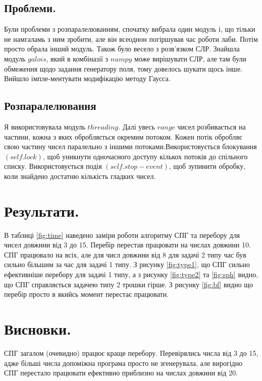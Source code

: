 \documentclass[a4paper,12pt]{article}
\begin{document}
\subsection{Проблеми.}
Були проблеми з розпаралелюванням, спочатку вибрала один модуль і, що тільки не намгаламь з ним зробити, але він всеоднон погіршував час роботи лаби. Потім просто обрала інший модуль. Також було весело з розв'язком СЛР. Знайшла модуль $galois$, який в комбіназії з $numpy$ може вирішувати СЛР, але там були обмеження щодо задання генератору поля, тому довелось шукати щось інше. Вийшло імпле-ментувати модифікацію методу Гаусса.
\subsection{Розпаралелювання}
Я використовувала модуль $threading$. Далі увесь $range$ чисел розбивається на частини, кожна з яких обробляється окремим потоком.  Кожен потік обробляє свою частину чисел паралельно з іншими потоками.Використовується блокування $(self.lock)$, щоб уникнути одночасного доступу кількох потоків до спільного списку. Використовується подія $(self.stop-event)$, щоб зупинити обробку, коли знайдено достатню кількість гладких чисел.
\section{Результати.}
В таблиці \ref{fig:time} наведено заміри роботи алгоритму СПГ та перебору для чисел довжини від 3 до 15. Перебір перестав працювати на числах довжини 10. СПГ працювало на всіх, але для числ довжини від 8 для задачі 2 типу час був сильно більшим за час для задачі 1 типу. З рисунку \ref{fig:type1}, що СПГ сильно ефективніше перебору для задачі 1 типу, а з рисунку \ref{fig:type2} та \ref{fig:sph} видно, що СПГ справляється задачею типу 2 трошки гірше. З рисунку \ref{fig:bf} видно що перебір просто в якийсь момент  перестає працювати. 
\section{Висновки.}
СПГ загалом (очевидно) працює краще перебору. Перевірялись числа від 3 до 15, адже більші числа допоміжна програма просто не згенерувала, але вирогідно СПГ перестало працювати ефективно приблизно на числах довжини від 20.
\newpage 
\end{document}
